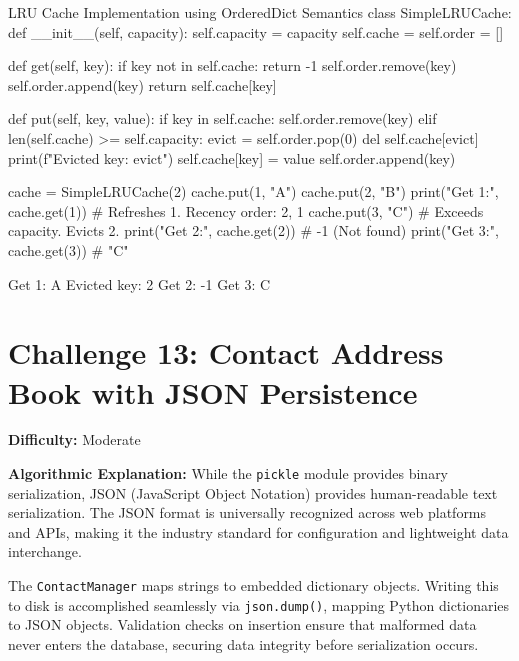 \begin{pythoncode}{LRU Cache Implementation using OrderedDict Semantics}
class SimpleLRUCache:
    def __init__(self, capacity):
        self.capacity = capacity
        self.cache = {}
        self.order = []

    def get(self, key):
        if key not in self.cache:
            return -1
        self.order.remove(key)
        self.order.append(key)
        return self.cache[key]

    def put(self, key, value):
        if key in self.cache:
            self.order.remove(key)
        elif len(self.cache) >= self.capacity:
            evict = self.order.pop(0)
            del self.cache[evict]
            print(f"Evicted key: {evict}")
        self.cache[key] = value
        self.order.append(key)

cache = SimpleLRUCache(2)
cache.put(1, "A")
cache.put(2, "B")
print("Get 1:", cache.get(1)) # Refreshes 1. Recency order: 2, 1
cache.put(3, "C")             # Exceeds capacity. Evicts 2.
print("Get 2:", cache.get(2)) # -1 (Not found)
print("Get 3:", cache.get(3)) # "C"
\end{pythoncode}

\begin{outputbox}
Get 1: A
Evicted key: 2
Get 2: -1
Get 3: C
\end{outputbox}

\section{Challenge 13: Contact Address Book with JSON Persistence}

\textbf{Difficulty:} Moderate

\textbf{Algorithmic Explanation:}
While the \texttt{pickle} module provides binary serialization, JSON (JavaScript Object Notation) provides human-readable text serialization. The JSON format is universally recognized across web platforms and APIs, making it the industry standard for configuration and lightweight data interchange.

The \texttt{ContactManager} maps strings to embedded dictionary objects. Writing this to disk is accomplished seamlessly via \texttt{json.dump()}, mapping Python dictionaries to JSON objects. Validation checks on insertion ensure that malformed data never enters the database, securing data integrity before serialization occurs.

